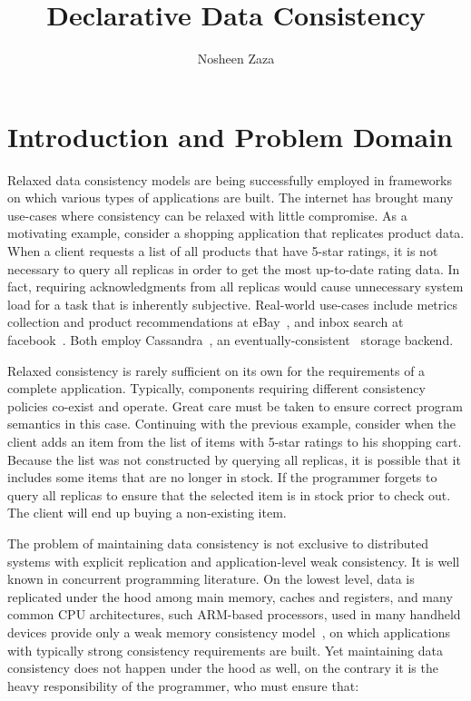 \documentclass[]{usiinfprospectus}
\author{Nosheen Zaza}
\title{Declarative Data Consistency }
\begin{document}
\maketitle


\section{Introduction and Problem Domain}

Relaxed data consistency models are being successfully employed in frameworks on which various types of applications are built. The internet has brought many use-cases where consistency can be relaxed with little compromise. As a motivating example, consider a shopping application that replicates product data. When a client requests a list of all products that have 5-star ratings, it is not necessary to query all replicas in order to get the most up-to-date rating data. In fact, requiring acknowledgments from all replicas would cause unnecessary system load for a task that is inherently subjective. Real-world use-cases include metrics collection and product recommendations at eBay~\cite{cassandraebay}, and inbox search at facebook~\cite{lakshman2010cassandra}. Both employ Cassandra~\cite{lakshman2010cassandra}, an eventually-consistent~\cite{vogels2009eventually} storage backend.



Relaxed consistency is rarely sufficient on its own for the requirements of a complete application. Typically, components requiring different consistency policies co-exist and operate. Great care must be taken to ensure correct program semantics in this case. Continuing with the previous example, consider  when the client adds an item from the list of items with 5-star ratings to his shopping cart. Because the list was not constructed by querying all replicas, it is possible that it includes some items that are no longer in stock. If the programmer forgets to query all replicas to ensure that the selected item is in stock prior to check out. The client will end up buying a non-existing item.

The problem of maintaining data consistency is not exclusive to distributed systems with explicit replication and application-level weak consistency. It is well known in concurrent programming literature. On the lowest level, data is replicated under the hood among main memory, caches and registers, and many common CPU architectures, such ARM-based processors, used in many handheld devices provide only a weak memory consistency model~\cite{Chong:2008:RAW:1353522.1353528}, on which applications with typically strong consistency requirements are built. Yet maintaining data consistency does not happen under the hood as well, on the contrary it is the heavy responsibility of the programmer, who must ensure that:
\end{document}
